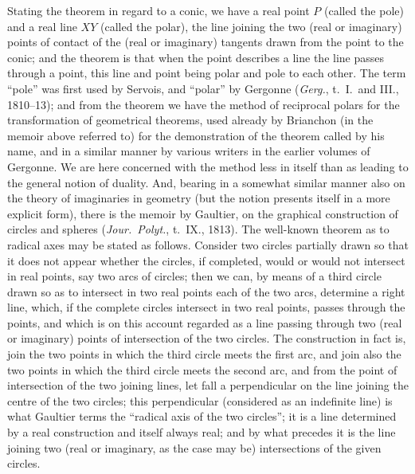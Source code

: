 \documentclass[12pt,a4paper,oneside]{book}
\begin{document}
Stating the theorem in regard to a conic, we have a real point $P$ (called the pole) and a real line $XY$ (called the polar), the line joining the two (real or imaginary) points of contact of the (real or imaginary) tangents drawn from the point to the conic; and the theorem is that when the point describes a line the line passes through a point, this line and point being polar and pole to each other. The term ``pole'' was first used by Servois, and ``polar'' by Gergonne (\textit{Gerg.}, t.~I.\ and III., 1810--13); and from the theorem we have the method of reciprocal polars for the transformation of geometrical theorems, used already by Brianchon (in the memoir above referred to) for the demonstration of the theorem called by his name, and in a similar manner by various writers in the earlier volumes of Gergonne. We are here concerned with the method less in itself than as leading to the general notion of duality. And, bearing in a somewhat similar manner also on the theory of imaginaries in geometry (but the notion presents itself in a more explicit form), there is the memoir by Gaultier, on the graphical construction of circles and spheres (\textit{Jour.\ Polyt.}, t.~IX., 1813). The well-known theorem as to radical axes may be stated as follows. Consider two circles partially drawn so that it does not appear whether the circles, if completed, would or would not intersect in real points, say two arcs of circles; then we can, by means of a third circle drawn so as to intersect in two real points each of the two arcs, determine a right line, which, if the complete circles intersect in two real points, passes through the points, and which is on this account regarded as a line passing through two (real or imaginary) points of intersection of the two circles. The construction in fact is, join the two points in which the third circle meets the first arc, and join also the two points in which the third circle meets the second arc, and from the point of intersection of the two joining lines, let fall a perpendicular on the line joining the centre of the two circles; this perpendicular (considered as an indefinite line) is what Gaultier terms the ``radical axis of the two circles''; it is a line determined by a real construction and itself always real; and by what precedes it is the line joining two (real or imaginary, as the case may be) intersections of the given circles.
\end{document}
